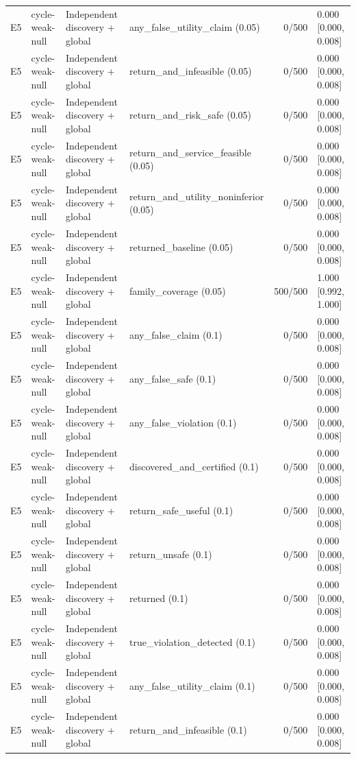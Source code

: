 \begin{longtable}{p{.04\linewidth}p{.18\linewidth}p{.19\linewidth}p{.16\linewidth}r p{.21\linewidth}}
E5 & cycle-weak-null & Independent discovery + global & any\_false\_utility\_claim (0.05) & 0/500 & 0.000 [0.000, 0.008]\\
E5 & cycle-weak-null & Independent discovery + global & return\_and\_infeasible (0.05) & 0/500 & 0.000 [0.000, 0.008]\\
E5 & cycle-weak-null & Independent discovery + global & return\_and\_risk\_safe (0.05) & 0/500 & 0.000 [0.000, 0.008]\\
E5 & cycle-weak-null & Independent discovery + global & return\_and\_service\_feasible (0.05) & 0/500 & 0.000 [0.000, 0.008]\\
E5 & cycle-weak-null & Independent discovery + global & return\_and\_utility\_noninferior (0.05) & 0/500 & 0.000 [0.000, 0.008]\\
E5 & cycle-weak-null & Independent discovery + global & returned\_baseline (0.05) & 0/500 & 0.000 [0.000, 0.008]\\
E5 & cycle-weak-null & Independent discovery + global & family\_coverage (0.05) & 500/500 & 1.000 [0.992, 1.000]\\
E5 & cycle-weak-null & Independent discovery + global & any\_false\_claim (0.1) & 0/500 & 0.000 [0.000, 0.008]\\
E5 & cycle-weak-null & Independent discovery + global & any\_false\_safe (0.1) & 0/500 & 0.000 [0.000, 0.008]\\
E5 & cycle-weak-null & Independent discovery + global & any\_false\_violation (0.1) & 0/500 & 0.000 [0.000, 0.008]\\
E5 & cycle-weak-null & Independent discovery + global & discovered\_and\_certified (0.1) & 0/500 & 0.000 [0.000, 0.008]\\
E5 & cycle-weak-null & Independent discovery + global & return\_safe\_useful (0.1) & 0/500 & 0.000 [0.000, 0.008]\\
E5 & cycle-weak-null & Independent discovery + global & return\_unsafe (0.1) & 0/500 & 0.000 [0.000, 0.008]\\
E5 & cycle-weak-null & Independent discovery + global & returned (0.1) & 0/500 & 0.000 [0.000, 0.008]\\
E5 & cycle-weak-null & Independent discovery + global & true\_violation\_detected (0.1) & 0/500 & 0.000 [0.000, 0.008]\\
E5 & cycle-weak-null & Independent discovery + global & any\_false\_utility\_claim (0.1) & 0/500 & 0.000 [0.000, 0.008]\\
E5 & cycle-weak-null & Independent discovery + global & return\_and\_infeasible (0.1) & 0/500 & 0.000 [0.000, 0.008]\\

\end{longtable}
